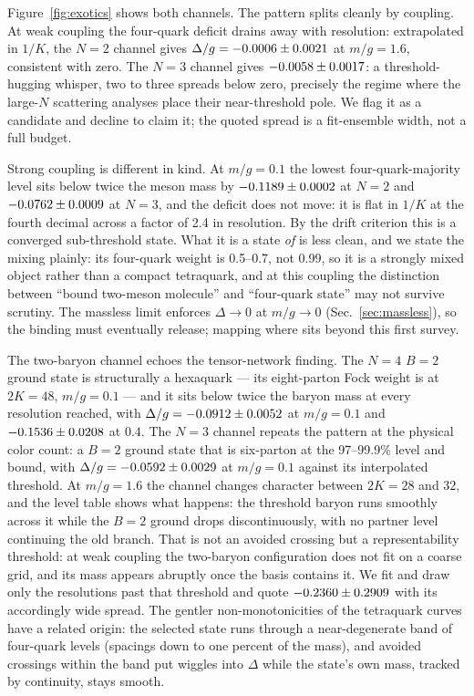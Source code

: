 Figure~\ref{fig:exotics} shows both channels.  The pattern splits cleanly
by coupling.  At weak coupling the four-quark deficit drains away with
resolution: extrapolated in $1/K$, the $N=2$ channel gives
$\Delta/g = -0.0006 \pm 0.0021$ at $m/g = 1.6$, consistent with
zero.  The $N=3$ channel gives $-0.0058 \pm 0.0017$: a
threshold-hugging whisper, two to three spreads below zero, precisely the
regime where the large-$N$ scattering analyses place their near-threshold
pole.  We flag it as a candidate and decline to claim it; the quoted
spread is a fit-ensemble width, not a full budget.

Strong coupling is different in kind.  At $m/g = 0.1$ the lowest
four-quark-majority level sits below twice the meson mass by
$-0.1189 \pm 0.0002$ at $N=2$ and
$-0.0762 \pm 0.0009$ at $N=3$, and the deficit does not move:
it is flat in $1/K$ at the fourth decimal across a factor of 2.4 in
resolution.  By the drift criterion this is a converged sub-threshold
state.  What it is a state \emph{of} is less clean, and we state the
mixing plainly: its four-quark weight is 0.5--0.7, not 0.99, so it is a
strongly mixed object rather than a compact tetraquark, and at this
coupling the distinction between ``bound two-meson molecule'' and
``four-quark state'' may not survive scrutiny.  The massless limit
enforces $\Delta \to 0$ at $m/g \to 0$ (Sec.~\ref{sec:massless}), so the
binding must eventually release; mapping where sits beyond this first
survey.

The two-baryon channel echoes the tensor-network finding.  The $N=4$
$B=2$ ground state is structurally a hexaquark --- its eight-parton Fock
weight is \numHexaEightqWeight{} at $2K=48$, $m/g=0.1$ --- and it sits
below twice the baryon mass at every resolution reached, with
$\Delta/g = -0.0912 \pm 0.0052$ at $m/g = 0.1$ and
$-0.1536 \pm 0.0208$ at $0.4$.  The $N=3$ channel repeats the
pattern at the physical color count: a $B=2$ ground state that is
six-parton at the 97--99.9\% level and bound, with
$\Delta/g = -0.0592 \pm 0.0029$ at $m/g = 0.1$ against its
interpolated threshold.  At $m/g = 1.6$ the channel changes
character between $2K = 28$ and $32$, and the level table shows what
happens: the threshold baryon runs smoothly across it while the $B=2$
ground drops discontinuously, with no partner level continuing the old
branch.  That is not an avoided crossing but a representability
threshold: at weak coupling the two-baryon configuration does not fit on
a coarse grid, and its mass appears abruptly once the basis contains it.
We fit and draw only the resolutions past that threshold and quote
$-0.2360 \pm 0.2909$ with its accordingly wide spread.  The gentler
non-monotonicities of the tetraquark curves have a related origin: the
selected state runs through a near-degenerate band of four-quark levels
(spacings down to one percent of the mass), and avoided crossings within
the band put wiggles into $\Delta$ while the state's own mass, tracked by
continuity, stays smooth.

